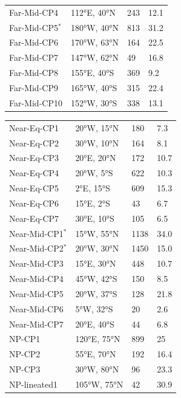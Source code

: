 \documentclass[preprint,11pt,3p,times,authoryear]{elsarticle}
\begin{document}
\begin{table}[ht!]
\begin{tabular}{p{4.0cm} p{3.0cm} p{2.0cm} p{3.0cm}}
  Far-Mid-CP4 & 112°E, 40°N & 243 &  12.1\\
  Far-Mid-CP5$^{*}$ & 180°W, 40°N & 813 & 31.2\\
  Far-Mid-CP6 & 170°W, 63°N & 164 &  22.5\\
  Far-Mid-CP7 & 147°W, 62°N & 49 &  16.8\\
  Far-Mid-CP8 & 155°E, 40°S & 369 &  9.2\\
  Far-Mid-CP9 & 165°W, 40°S & 315 &  22.4\\
  Far-Mid-CP10 & 152°W, 30°S & 338 & 13.1 \\
\hline
\end{tabular}
\end{table}

\begin{table}[ht!]
\centering
  \begin{tabular}{p{4.0cm} p{3.0cm} p{2.0cm} p{3.0cm} }
\hline
\hline
  Near-Eq-CP1 & 20°W, 15°N & 180 &  7.3\\
  Near-Eq-CP2 & 30°W, 10°N & 164 &  8.1\\
  Near-Eq-CP3 & 20°E, 20°N & 172 &  10.7\\
  Near-Eq-CP4 & 20°W, 5°S & 622 &  10.3\\
  Near-Eq-CP5 & 2°E, 15°S & 609 &  15.3\\
  Near-Eq-CP6 & 15°E, 2°S & 43 &  6.7\\
  Near-Eq-CP7 & 30°E, 10°S & 105 &  6.5\\
  Near-Mid-CP1$^{*}$ & 15°W, 55°N & 1138 & 34.0 \\
  Near-Mid-CP2$^{*}$ & 20°W, 30°N & 1450 & 15.0 \\
  Near-Mid-CP3 & 15°E, 30°N & 448 &  10.7\\
  Near-Mid-CP4 & 45°W, 42°S & 150 &  8.5\\
  Near-Mid-CP5 & 20°W, 37°S & 128 &  21.8\\
  Near-Mid-CP6 & 5°W, 32°S & 20 &  2.6\\
  Near-Mid-CP7 & 20°E, 40°S & 44 &  6.8\\
  NP-CP1 & 120°E, 75°N & 899 &  25\\
  NP-CP2 & 55°E, 70°N & 192 &  16.4\\
  NP-CP3 & 30°W, 80°N & 96 &  23.3\\
  NP-lineated1 & 105°W, 75°N & 42 &  30.9\\

\end{tabular}
\end{table}
\end{document}
